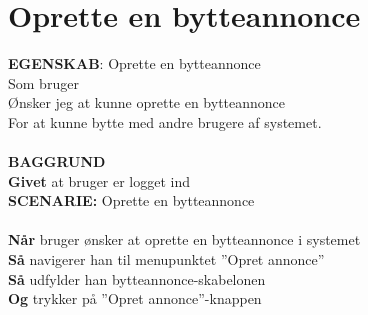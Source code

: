 \section{Oprette en bytteannonce}
{\color{blue}\textbf{EGENSKAB}:} Oprette en bytteannonce \\
Som bruger \\
Ønsker jeg at kunne oprette en bytteannonce \\
For at kunne bytte med andre brugere af systemet.\\ \\
{\color{blue}\textbf{BAGGRUND}} \\
{\color{blue}\textbf{Givet}} at bruger er logget ind \\
{\color{blue}\textbf{SCENARIE:}} Oprette en bytteannonce \\ \\
{\color{blue}\textbf{Når}}  bruger ønsker at oprette en bytteannonce i systemet \\
{\color{blue}\textbf{Så}} navigerer han til menupunktet ”Opret annonce” \\
{\color{blue}\textbf{Så}} udfylder han bytteannonce-skabelonen \\
{\color{blue}\textbf{Og}} trykker på ”Opret annonce”-knappen